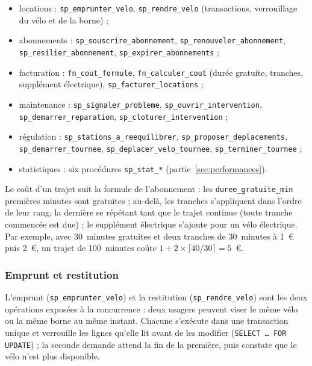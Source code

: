 \begin{itemize}
	\item locations : \texttt{sp\_emprunter\_velo}, \texttt{sp\_rendre\_velo} (transactions, verrouillage du vélo et de la borne) ;
	\item abonnements : \texttt{sp\_souscrire\_abonnement}, \texttt{sp\_renouveler\_abonnement}, \texttt{sp\_resilier\_abonnement}, \texttt{sp\_expirer\_abonnements} ;
	\item facturation : \texttt{fn\_cout\_formule}, \texttt{fn\_calculer\_cout} (durée gratuite, tranches, supplément électrique), \texttt{sp\_facturer\_locations} ;
	\item maintenance : \texttt{sp\_signaler\_probleme}, \texttt{sp\_ouvrir\_intervention}, \texttt{sp\_demarrer\_reparation}, \texttt{sp\_cloturer\_intervention} ;
	\item régulation : \texttt{sp\_stations\_a\_reequilibrer}, \texttt{sp\_proposer\_deplacements}, \texttt{sp\_demarrer\_tournee}, \texttt{sp\_deplacer\_velo\_tournee}, \texttt{sp\_terminer\_tournee} ;
	\item statistiques : six procédures \texttt{sp\_stat\_*} (partie~\ref{sec:performances}).
\end{itemize}

Le coût d'un trajet suit la formule de l'abonnement : les \texttt{duree\_gratuite\_min} premières minutes sont gratuites ; au-delà, les tranches s'appliquent dans l'ordre de leur rang, la dernière se répétant tant que le trajet continue (toute tranche commencée est due) ; le supplément électrique s'ajoute pour un vélo électrique. Par exemple, avec 30~minutes gratuites et deux tranches de 30~minutes à 1~€ puis 2~€, un trajet de 100~minutes coûte $1 + 2 \times \lceil 40/30 \rceil = 5$~€.

\subsubsection*{Emprunt et restitution}

L'emprunt (\texttt{sp\_emprunter\_velo}) et la restitution (\texttt{sp\_rendre\_velo}) sont les deux opérations exposées à la concurrence : deux usagers peuvent viser le même vélo ou la même borne au même instant. Chacune s'exécute dans une transaction unique et verrouille les lignes qu'elle lit avant de les modifier (\texttt{SELECT \ldots{} FOR UPDATE}) ; la seconde demande attend la fin de la première, puis constate que le vélo n'est plus disponible.

